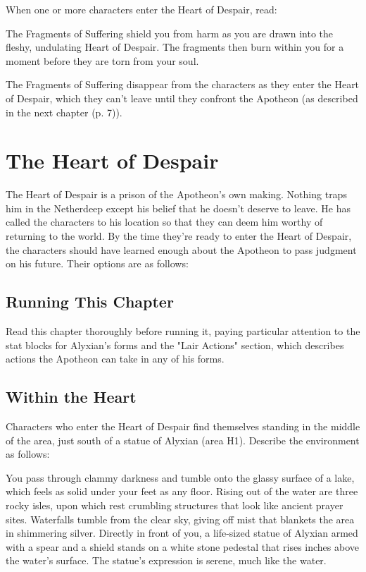 \documentclass[a4paper, 11pt, bg=full, twocolumn, nooutline]{dndbook}
\begin{document}
When one or more characters enter the Heart of Despair, read:

\begin{DndReadAloud}
The Fragments of Suffering shield you from harm as you are drawn into the fleshy, undulating Heart of Despair. The fragments then burn within you for a moment before they are torn from your soul.
\end{DndReadAloud}

The Fragments of Suffering disappear from the characters as they enter the Heart of Despair, which they can't leave until they confront the Apotheon (as described in the next chapter (p. 7)).

\chapter{The Heart of Despair}\label{ch:the-heart-of-despair-8-8}

The Heart of Despair is a prison of the Apotheon's own making. Nothing traps him in the Netherdeep except his belief that he doesn't deserve to leave. He has called the characters to his location so that they can deem him worthy of returning to the world. By the time they're ready to enter the Heart of Despair, the characters should have learned enough about the Apotheon to pass judgment on his future. Their options are as follows:
\section{Running This Chapter}

Read this chapter thoroughly before running it, paying particular attention to the stat blocks for Alyxian's forms and the "Lair Actions" section, which describes actions the Apotheon can take in any of his forms.
\section{Within the Heart}

Characters who enter the Heart of Despair find themselves standing in the middle of the area, just south of a statue of Alyxian (area H1). Describe the environment as follows:

\begin{DndReadAloud}
You pass through clammy darkness and tumble onto the glassy surface of a lake, which feels as solid under your feet as any floor. Rising out of the water are three rocky isles, upon which rest crumbling structures that look like ancient prayer sites.
Waterfalls tumble from the clear sky, giving off mist that blankets the area in shimmering silver. Directly in front of you, a life-sized statue of Alyxian armed with a spear and a shield stands on a white stone pedestal that rises inches above the water's surface. The statue's expression is serene, much like the water.
\end{DndReadAloud}
\end{document}
